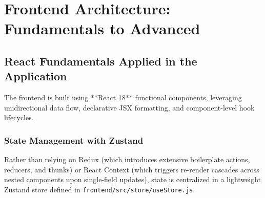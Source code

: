 \documentclass[11pt,a4paper,oneside]{report}
\begin{document}


\chapter{Frontend Architecture: Fundamentals to Advanced}

\section{React Fundamentals Applied in the Application}
The frontend is built using **React 18** functional components, leveraging unidirectional data flow, declarative JSX formatting, and component-level hook lifecycles.

\subsection{State Management with Zustand}
Rather than relying on Redux (which introduces extensive boilerplate actions, reducers, and thunks) or React Context (which triggers re-render cascades across nested components upon single-field updates), state is centralized in a lightweight Zustand store defined in \texttt{frontend/src/store/useStore.js}.
\end{document}

